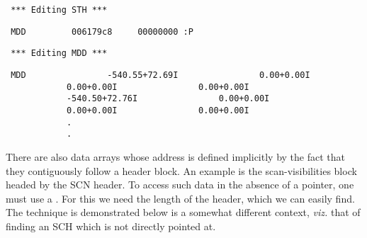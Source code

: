 \spbegin %
\svbegin \begin{verbatim} 
 *** Editing STH *** 
\end{verbatim}\svend 
%
%
\svbegin \begin{verbatim} 
 MDD         006179c8     00000000 :P 
\end{verbatim} 
\svend 
\spend %
%
\spbegin %
%
\svbegin \begin{verbatim} 
 *** Editing MDD *** 
\end{verbatim} 
\svend 
\spend %
%
\spbegin %
\suser{*} 
%
\svbegin \begin{verbatim} 
 MDD                -540.55+72.69I                0.00+0.00I
			0.00+0.00I                0.00+0.00I
		    -540.50+72.76I                0.00+0.00I
			0.00+0.00I                0.00+0.00I
			.
			.

\end{verbatim} 
\svend 
\spend %


	There are also data arrays whose address is defined implicitly by the
fact that they contiguously follow a header block.  An example is the
scan-visibilities block headed by the SCN header.  To access such data in the
absence of a pointer, one must use a 
. 
For this we need the length of the header, which we can easily find.  The
technique is demonstrated below is a somewhat different context, {\it viz.}
that of finding an SCH which is not directly pointed at. 


